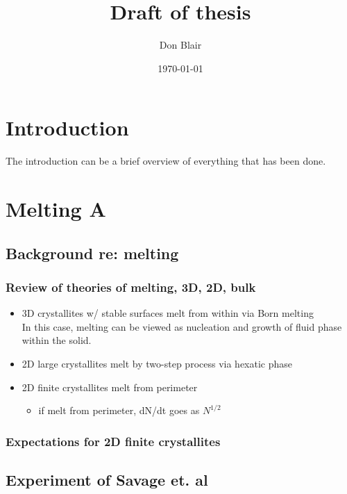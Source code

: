 \documentclass[11pt]{article}
\title{Draft of thesis}
\author{Don Blair}
\date{\today}
\begin{document}
\maketitle

\setcounter{tocdepth}{3}
\tableofcontents
\vspace*{1cm}
\section{Introduction}
\label{sec-1}


The introduction can be a brief overview of everything that has been done.
\section{Melting A}
\label{sec-2}
\subsection{Background re: melting}
\label{sec-2-1}
\subsubsection{Review of theories of melting, 3D, 2D, bulk}
\label{sec-2-1-1}
\begin{itemize}

\item 3D crystallites w/ stable surfaces melt from within via Born melting\\
\label{sec-2-1-1-1}%
In this case, melting can be viewed as nucleation and growth of fluid phase within the solid.

\item 2D large crystallites melt by two-step process via hexatic phase\\
\label{sec-2-1-1-2}%
\item 2D finite crystallites melt from perimeter
\label{sec-2-1-1-3}%
\begin{itemize}

\item if melt from perimeter, dN/dt goes as $N^{1/2}$\\
\label{sec-2-1-1-3-1}%
\end{itemize} %
\end{itemize} %
\subsubsection{Expectations for 2D finite crystallites}
\label{sec-2-1-2}
\subsection{Experiment of Savage et. al}
\label{sec-2-2}
\end{document}
